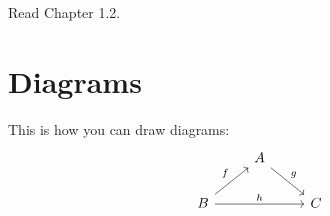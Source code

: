 \def\pathToRoot{../../}




\begin{hint}
  Read Chapter 1.2.
\end{hint}

\section{Diagrams}

\begin{hint}
  This is how you can draw diagrams:
  \[
    \begin{tikzcd}
                                    & A \arrow{dr}{g}    & \\
      B \arrow{ur}{f} \arrow{rr}{h} &                    & C
    \end{tikzcd}
  \]
\end{hint}



